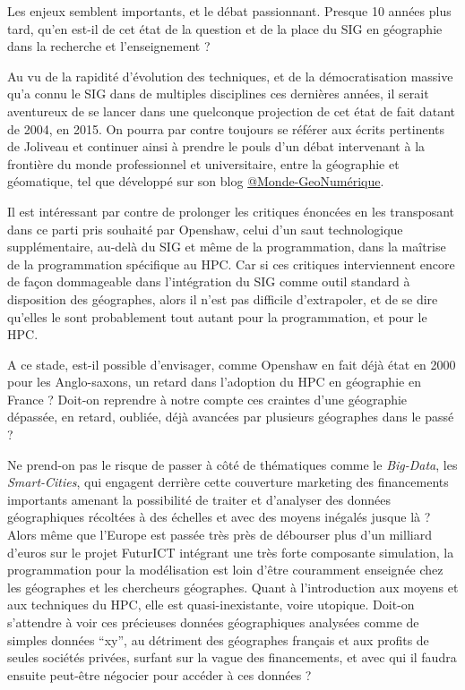 Les enjeux semblent importants, et le débat passionnant. Presque 10 années plus tard, qu'en est-il de cet état de la question et de la place du SIG en géographie dans la recherche et l'enseignement ?

Au vu de la rapidité d'évolution des techniques, et de la démocratisation massive qu'a connu le SIG dans de multiples disciplines ces dernières années, il serait aventureux de se lancer dans une quelconque projection de cet état de fait datant de 2004, en 2015. On pourra par contre toujours se référer aux écrits pertinents de Joliveau et continuer ainsi à prendre le pouls d'un débat intervenant à la frontière du monde professionnel et universitaire, entre la géographie et géomatique, tel que développé sur son blog \href{https://mondegeonumerique.wordpress.com/}{@Monde-GeoNumérique}.

Il est intéressant par contre de prolonger les critiques énoncées en les transposant dans ce parti pris souhaité par Openshaw, celui d'un saut technologique supplémentaire, au-delà du SIG et même de la programmation, dans la maîtrise de la programmation spécifique au HPC. Car si ces critiques interviennent encore de façon dommageable dans l'intégration du SIG comme outil standard à disposition des géographes, alors il n'est pas difficile d'extrapoler, et de se dire qu'elles le sont probablement tout autant pour la programmation, et pour le HPC.

A ce stade, est-il possible d'envisager, comme Openshaw en fait déjà état en 2000 pour les Anglo-saxons, un retard dans l'adoption du HPC en géographie en France ? Doit-on reprendre à notre compte ces craintes d'une géographie dépassée, en retard, oubliée, déjà avancées par plusieurs géographes dans le passé  ?

Ne prend-on pas le risque de passer à côté de thématiques comme le \textit{Big-Data}, les \textit{Smart-Cities}, qui engagent derrière cette couverture marketing des financements importants amenant la possibilité de traiter et d’analyser des données géographiques récoltées à des échelles et avec des moyens inégalés jusque là ? Alors même que l’Europe est passée très près de débourser plus d'un milliard d’euros sur le projet FuturICT intégrant une très forte composante simulation, la programmation pour la modélisation est loin d’être couramment enseignée chez les géographes et les chercheurs géographes. Quant à l'introduction aux moyens et aux techniques du HPC, elle est quasi-inexistante, voire utopique. Doit-on s’attendre à voir ces précieuses données géographiques analysées comme de simples données \enquote{xy}, au détriment des géographes français et aux profits de seules sociétés privées, surfant sur la vague des financements, et avec qui il faudra ensuite peut-être négocier pour accéder à ces données ?

